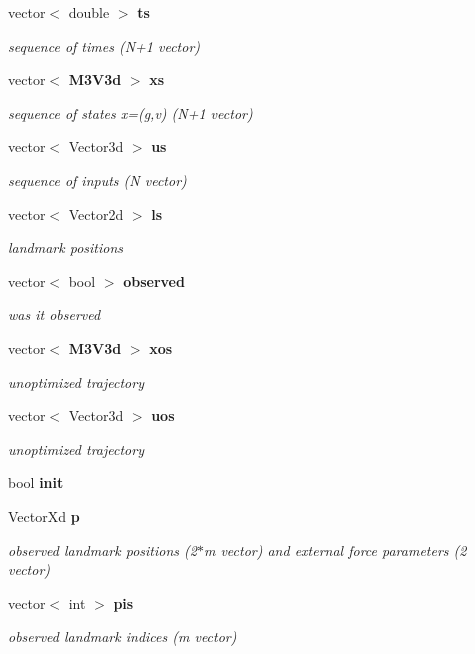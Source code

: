 \begin{DoxyCompactItemize}
vector$<$ double $>$ {\bf ts}
\begin{DoxyCompactList}\small\item\em sequence of times (\-N+1 vector) \end{DoxyCompactList}\item 
vector$<$ {\bf \-M3\-V3d} $>$ {\bf xs}
\begin{DoxyCompactList}\small\item\em sequence of states x=(g,v) (\-N+1 vector) \end{DoxyCompactList}\item 
vector$<$ \-Vector3d $>$ {\bf us}
\begin{DoxyCompactList}\small\item\em sequence of inputs (\-N vector) \end{DoxyCompactList}\item 
vector$<$ \-Vector2d $>$ {\bf ls}
\begin{DoxyCompactList}\small\item\em landmark positions \end{DoxyCompactList}\item 
vector$<$ bool $>$ {\bf observed}
\begin{DoxyCompactList}\small\item\em was it observed \end{DoxyCompactList}\item 
vector$<$ {\bf \-M3\-V3d} $>$ {\bf xos}
\begin{DoxyCompactList}\small\item\em unoptimized trajectory \end{DoxyCompactList}\item 
vector$<$ \-Vector3d $>$ {\bf uos}
\begin{DoxyCompactList}\small\item\em unoptimized trajectory \end{DoxyCompactList}\item 
bool {\bf init}
\item 
\-Vector\-Xd {\bf p}
\begin{DoxyCompactList}\small\item\em observed landmark positions (2$\ast$m vector) and external force parameters (2 vector) \end{DoxyCompactList}\item 
vector$<$ int $>$ {\bf pis}
\begin{DoxyCompactList}\small\item\em observed landmark indices (m vector) \end{DoxyCompactList}\item 

\end{DoxyCompactItemize}
